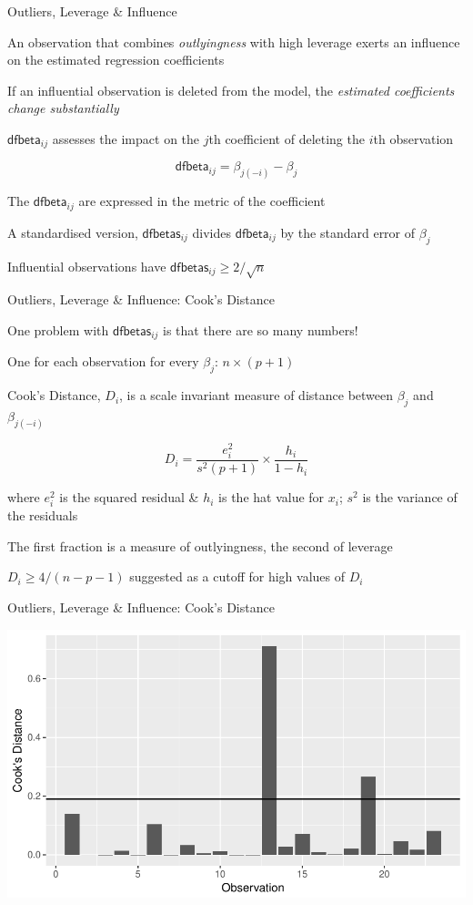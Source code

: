 \documentclass[10pt,ignorenonframetext,compress, aspectratio=169]{beamer}
\begin{document}
\begin{frame}{Outliers, Leverage \& Influence}

An observation that combines \emph{outlyingness} with high leverage
exerts an \alert{influence} on the estimated regression coefficients

If an influential observation is deleted from the model, the
\emph{estimated coefficients change substantially}

\(\mathsf{dfbeta}_{ij}\) assesses the impact on the \(j\)th coefficient
of deleting the \(i\)th observation

\[\mathsf{dfbeta}_{ij} = \beta_{j(-i)} - \beta_j\]

The \(\mathsf{dfbeta}_{ij}\) are expressed in the metric of the
coefficient

A standardised version, \(\mathsf{dfbetas}_{ij}\) divides
\(\mathsf{dfbeta}_{ij}\) by the standard error of \(\beta_j\)

Influential observations have
\(\mathsf{dfbetas}_{ij} \geq 2 / \sqrt{n}\)

\end{frame}

\begin{frame}{Outliers, Leverage \& Influence: Cook's Distance}

One problem with \(\mathsf{dfbetas}_{ij}\) is that there are so many
numbers!

One for each observation for every \(\beta_j\): \(n \times (p+1)\)

\alert{Cook's Distance}, \(D_i\), is a scale invariant measure of
distance between \(\beta_j\) and \(\beta_{j(-i)}\)

\[D_i = \frac{e^2_i}{s^2(p+1)} \times \frac{h_i}{1-h_i}\]

where \(e_i^2\) is the squared residual \& \(h_i\) is the hat value for
\(x_i\); \(s^2\) is the variance of the residuals

The first fraction is a measure of \alert{outlyingness}, the second of
\alert{leverage}

\(D_i \geq 4 / (n - p - 1)\) suggested as a cutoff for high values of
\(D_i\)

\end{frame}

\begin{frame}{Outliers, Leverage \& Influence: Cook's Distance}

\begin{center}\includegraphics[width=0.7\linewidth]{03-linear-models_files/figure-beamer/svmod-cooks-distance-plot-1} \end{center}

\end{frame}
\end{document}
